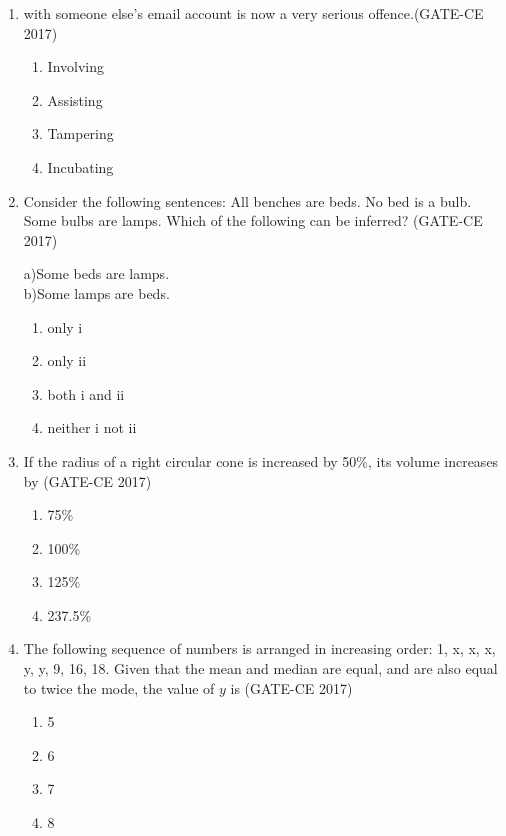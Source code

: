 \documentclass[journal,12pt,onecolumn]{article}
\theoremstyle{remark}
\begin{document}
\begin{enumerate}
    \item \underline{\hspace{3cm}} with someone else's email account is now a very serious offence.\hfill (GATE-CE 2017)
    \begin{multicols}{4}
    \begin{enumerate}
        \item Involving
        \item Assisting
        \item Tampering
        \item Incubating
    \end{enumerate}
    \end{multicols}

    \item Consider the following sentences:
    All benches are beds. No bed is a bulb. Some bulbs are lamps.
    Which of the following can be inferred? \hfill (GATE-CE 2017)

        a)Some beds are lamps.\\
        b)Some lamps are beds.
    \begin{multicols}{2}
    \begin{enumerate}
        \item only i
        \item only ii
        \item both i and ii
        \item neither i not ii
    \end{enumerate}
    \end{multicols}

    \item If the radius of a right circular cone is increased by 50\%, its volume increases by \underline{\hspace{3cm}}\hfill (GATE-CE 2017)
    \begin{multicols}{4}
    \begin{enumerate}
        \item 75\%
        \item 100\%
        \item 125\%
        \item 237.5\%
    \end{enumerate}
    \end{multicols}

    \item The following sequence of numbers is arranged in increasing order: 1, x, x, x, y, y, 9, 16, 18. Given that the mean and median are equal, and are also equal to twice the mode, the value of $y$ is 
    \hfill (GATE-CE 2017)
    \begin{multicols}{4}
    \begin{enumerate}
        \item 5
        \item 6
        \item 7
        \item 8
    \end{enumerate}
    \end{multicols}


\end{enumerate}
\end{document}
